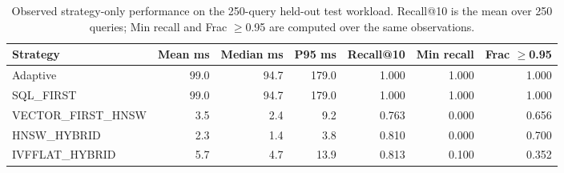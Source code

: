 \begin{table}[t]
\centering
\caption{Observed strategy-only performance on the 250-query held-out test workload. Recall@10 is the mean over 250 queries; Min recall and Frac $\geq$0.95 are computed over the same observations.}
\label{tab:strategy-comparison}
\scriptsize
\begin{tabular}{lrrrrrr}
\toprule
Strategy & Mean ms & Median ms & P95 ms & Recall@10 & Min recall & Frac $\geq$0.95 \\
\midrule
Adaptive & 99.0 & 94.7 & 179.0 & 1.000 & 1.000 & 1.000 \\
SQL\_FIRST & 99.0 & 94.7 & 179.0 & 1.000 & 1.000 & 1.000 \\
VECTOR\_FIRST\_HNSW & 3.5 & 2.4 & 9.2 & 0.763 & 0.000 & 0.656 \\
HNSW\_HYBRID & 2.3 & 1.4 & 3.8 & 0.810 & 0.000 & 0.700 \\
IVFFLAT\_HYBRID & 5.7 & 4.7 & 13.9 & 0.813 & 0.100 & 0.352 \\
\bottomrule
\end{tabular}
\end{table}
